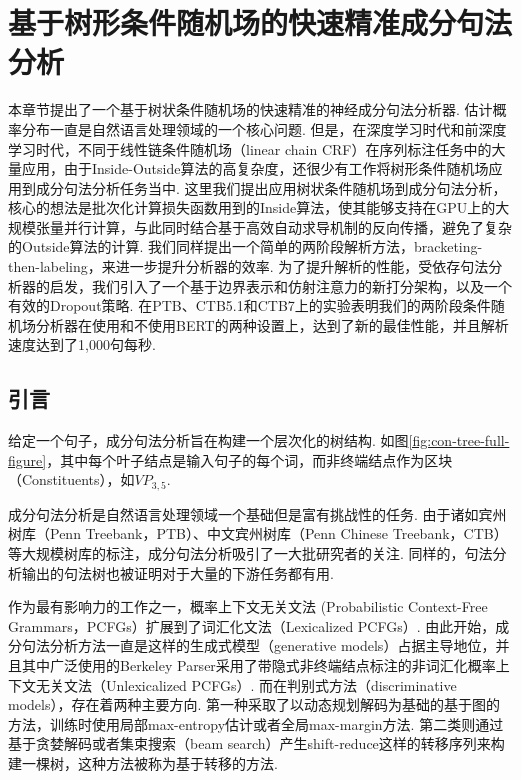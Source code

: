 \chapter{基于树形条件随机场的快速精准成分句法分析}
\label{cha:con-crf}

本章节提出了一个基于树状条件随机场的快速精准的神经成分句法分析器.
估计概率分布一直是自然语言处理领域的一个核心问题.
但是，在深度学习时代和前深度学习时代，不同于线性链条件随机场（linear chain CRF）在序列标注任务中的大量应用，由于Inside-Outside算法的高复杂度，还很少有工作将树形条件随机场应用到成分句法分析任务当中.
这里我们提出应用树状条件随机场到成分句法分析，核心的想法是批次化计算损失函数用到的Inside算法，使其能够支持在GPU上的大规模张量并行计算，与此同时结合基于高效自动求导机制的反向传播，避免了复杂的Outside算法的计算.
我们同样提出一个简单的两阶段解析方法，bracketing-then-labeling，来进一步提升分析器的效率.
为了提升解析的性能，受依存句法分析器的启发，我们引入了一个基于边界表示和仿射注意力的新打分架构，以及一个有效的Dropout策略.
在PTB、CTB5.1和CTB7上的实验表明我们的两阶段条件随机场分析器在使用和不使用BERT的两种设置上，达到了新的最佳性能，并且解析速度达到了1,000句每秒.

\section{引言}\label{sec:con-intro}


给定一个句子，成分句法分析旨在构建一个层次化的树结构. 如图\ref{fig:con-tree-full-figure}，其中每个叶子结点是输入句子的每个词，而非终端结点作为区块（Constituents），如\texttt{$VP_{3,5}$}.

成分句法分析是自然语言处理领域一个基础但是富有挑战性的任务.
由于诸如宾州树库（Penn Treebank，PTB）、中文宾州树库（Penn Chinese Treebank，CTB）等大规模树库的标注，成分句法分析吸引了一大批研究者的关注.
同样的，句法分析输出的句法树也被证明对于大量的下游任务\cite{akoury-etal-2019-syntactically,wang-etal-2018-tree}都有用.

作为最有影响力的工作之一，\cite{collins-1997-three}概率上下文无关文法 (Probabilistic Context-Free Grammars，PCFGs）扩展到了词汇化文法（Lexicalized PCFGs）.
由此开始，成分句法分析方法一直是这样的生成式模型（generative models）占据主导地位，并且其中广泛使用的Berkeley Parser采用了带隐式非终端结点标注的非词汇化概率上下文无关文法（Unlexicalized PCFGs）\cite{matsuzaki-etal-2005-probabilistic,petrov-klein-2007-improved}.
而在判别式方法（discriminative models），存在着两种主要方向.
第一种采取了以动态规划解码为基础的基于图的方法，训练时使用局部max-entropy估计\cite{kaplan-etal-2004-speed}或者全局max-margin方法\cite{taskar-etal-2004-max}.
第二类则通过基于贪婪解码或者集束搜索（beam search）产生shift-reduce这样的转移序列来构建一棵树，这种方法被称为基于转移的方法\cite{sagae-lavie-2005-classifier,zhu-etal-2013-fast}.

